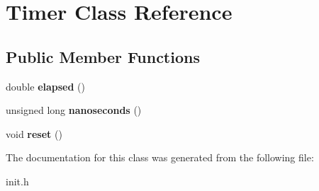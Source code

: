 \hypertarget{classTimer}{}\section{Timer Class Reference}
\label{classTimer}
\subsection*{Public Member Functions}
\begin{DoxyCompactItemize}
\item 
double {\bfseries elapsed} ()\hypertarget{classTimer_a7a0f15257db9fa349a43042d3d28349b}{}\label{classTimer_a7a0f15257db9fa349a43042d3d28349b}

\item 
unsigned long {\bfseries nanoseconds} ()\hypertarget{classTimer_a8e055136a144144d39628b64512b9067}{}\label{classTimer_a8e055136a144144d39628b64512b9067}

\item 
void {\bfseries reset} ()\hypertarget{classTimer_a9020542d73357a4eef512eefaf57524b}{}\label{classTimer_a9020542d73357a4eef512eefaf57524b}

\end{DoxyCompactItemize}


The documentation for this class was generated from the following file\+:\begin{DoxyCompactItemize}
\item 
init.\+h\end{DoxyCompactItemize}
